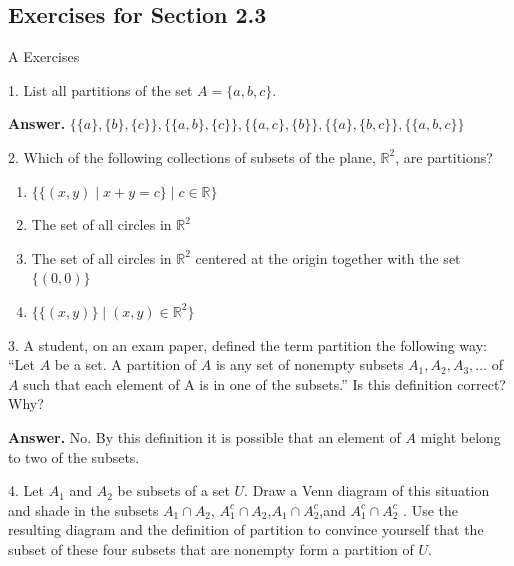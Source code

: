 \documentclass[10pt,]{book}
\theoremstyle{plain}
\theoremstyle{definition}
\theoremstyle{definition}
\theoremstyle{definition}
\begin{document}
\subsection[Exercises for Section 2.3]{Exercises for Section 2.3}\label{exercises-2-3}
\hypertarget{exercisegroup-5}{}\typeout{************************************************}
\typeout{************************************************}
A Exercises%
\begin{exercisegroup}
\item[1.]\hypertarget{exercise-32}{} List all partitions of the set \(A =\{a, b, c\}\).%
\par\smallskip
\par\smallskip
\noindent\textbf{Answer.}\hypertarget{answer-17}{}\quad
 \(\{\{a\}, \{b\}, \{c\}\}, \{\{a, b\}, \{c\}\}, \{\{a, c\}, \{b\}\}, \{\{a\}, \{b, c\}\}, \{\{a, b, c\}\}\)%
\item[2.]\hypertarget{exercise-33}{}Which of the following collections of subsets of the plane, \( \mathbb{R}^2\), are partitions?%
\par
\leavevmode%
\begin{enumerate}[label=\alph*]
\item\hypertarget{li-48}{}\( \{ \{(x, y) \mid x + y = c \} \mid c \in \mathbb{R} \}\)%
\item\hypertarget{li-49}{} The set of all circles in \( \mathbb{R}^2 \)%
\item\hypertarget{li-50}{} The set of all circles in \(\mathbb{R}^2\) centered at the origin together with the set \(\{(0,0)\}\)%
\item\hypertarget{li-51}{}\(\{\{(x, y)\} \mid (x, y) \in \mathbb{R}^2  \} \)%
\end{enumerate}
%
\par\smallskip
\item[3.]\hypertarget{exercise-34}{}A student, on an exam paper, defined the term partition the following way: ``Let \(A\)  be a set. A partition of \(A\) is any set of nonempty subsets \(A_1, A_2, A_3, \dots\)  of \(A\) such that each element of A is in one of the subsets.''  Is this definition correct? Why?%
\par\smallskip
\par\smallskip
\noindent\textbf{Answer.}\hypertarget{answer-18}{}\quad
 No. By this definition it is possible that an element of \(A\) might belong to two of the subsets.%
\item[4.]\hypertarget{exercise-35}{} Let \(A_1\) and \(A_2\) be subsets of a set \(U\).   Draw a Venn diagram of this situation and shade in the subsets \(A_1 \cap A_2\), \(A_1^c \cap A_2\),\(A_1 \cap A_2^c\),and \(A_1^c \cap A_2^c\) . Use the resulting diagram and the definition of partition to convince yourself that the subset of these four subsets that are nonempty form a partition of \(U\).%

\end{exercisegroup}
\end{document}
